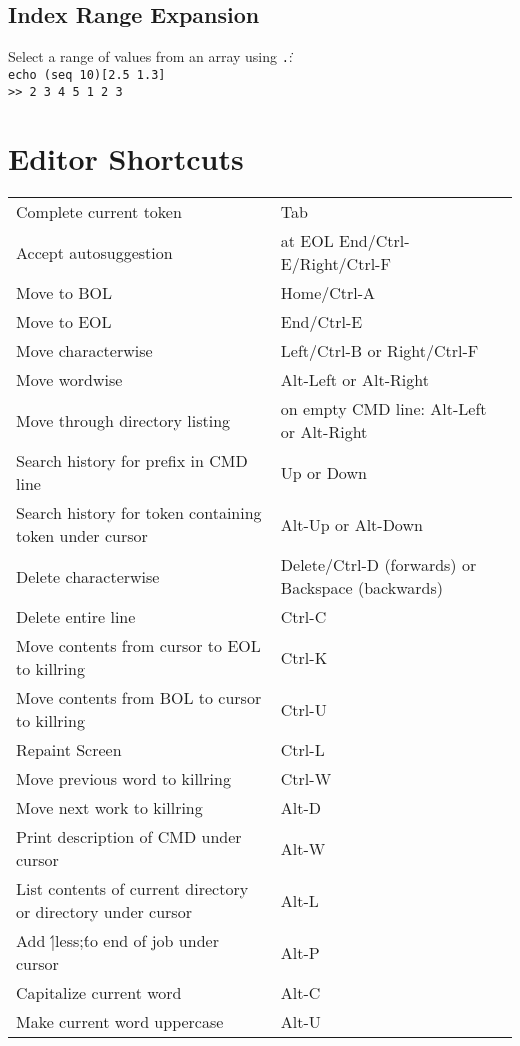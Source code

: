 \documentclass[10pt]{extarticle}
\begin{document}
\begin{paracol}{2}
\subsection*{Index Range Expansion}

Select a range of values from an array using \texttt{\..}:\\
\texttt{echo (seq 10)[2\..5 1\..3]}\\
\texttt{>> 2 3 4 5 1 2 3}

\switchcolumn{}

\section*{Editor Shortcuts}

\begin{tabularx}{\columnwidth}{X >{\ttfamily}X}
    Complete current token & Tab \\
    Accept autosuggestion & at EOL\: End/Ctrl-E/Right/Ctrl-F \\
    Move to BOL & Home/Ctrl-A \\
    Move to EOL & End/Ctrl-E \\
    Move characterwise & Left/Ctrl-B or Right/Ctrl-F \\
    Move wordwise & Alt-Left or Alt-Right \\
    Move through directory listing & on empty CMD line: Alt-Left or Alt-Right \\
    Search history for prefix in CMD line & Up or Down \\
    Search history for token containing token under cursor & Alt-Up or Alt-Down \\
    Delete characterwise & Delete/Ctrl-D (forwards) or Backspace (backwards) \\
    Delete entire line & Ctrl-C \\
    Move contents from cursor to EOL to killring & Ctrl-K \\
    Move contents from BOL to cursor to killring & Ctrl-U \\
    Repaint Screen & Ctrl-L \\
    Move previous word to killring & Ctrl-W \\
    Move next work to killring & Alt-D \\
    Print description of CMD under cursor & Alt-W \\
    List contents of current directory or directory under cursor & Alt-L \\
    Add \'|less;\' to end of job under cursor & Alt-P \\
    Capitalize current word & Alt-C \\
    Make current word uppercase & Alt-U
\end{tabularx}

\end{paracol}
\end{document}
